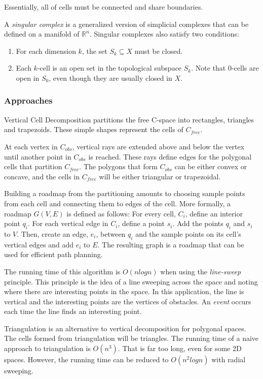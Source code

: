 \documentclass[10pt,conference]{ieeeconf}
\begin{document}
Essentially, all of cells must be connected and share boundaries. 

A \emph{singular complex} is a generalized version of simplicial complexes that can be defined on a manifold of $\mathbb{R}^n$. Singular complexes also satisfy two conditions:

\begin{enumerate}
\item For each dimension $k$, the set $S_k \subseteq X$ must be closed. 
\item Each $k$-cell is an open set in the topological subspace $S_k$. Note that 0-cells are open in $S_0$, even though they are usually closed in $X$.
\end{enumerate} 

\subsubsection{Approaches}

Vertical Cell Decomposition partitions the free C-space into rectangles, triangles and trapezoids. These simple shapes represent the cells of $C_{free}$. 

At each vertex in $C_{obs}$, vertical rays are extended above and below the vertex until another point in $C_{obs}$ is reached. These rays define edges for the polygonal cells that partition $C_{free}$. The polygons that form $C_{obs}$ can be either convex or concave, and the cells in $C_{free}$ will be either triangular or trapezoidal. 

Building a roadmap from the partitioning amounts to choosing sample points from each cell and connecting them to edges of the cell. More formally, a roadmap $G(V,E)$ is defined as follows: For every cell, $C_i$, define an interior point $q_i$. For each vertical edge in $C_i$, define a point $s_i$. Add the points $q_i$ and $s_i$ to $V$. Then, create an edge, $e_i$, between $q_i$ and the sample points on its cell's vertical edges and add $e_i$ to $E$. The resulting graph is a roadmap that can be used for efficient path planning.

The running time of this algorithm is $O(nlogn)$ when using the \emph{line-sweep} principle. This principle is the idea of a line sweeping across the space and noting where there are interesting points in the space. In this application, the line is vertical and the interesting points are the vertices of obstacles. An \emph{event} occurs each time the line finds an interesting point. 

Triangulation is an alternative to vertical decomposition for polygonal spaces. The cells formed from triangulation will be triangles. The running time of a naive approach to triangulation is $O(n^3)$. That is far too long, even for some 2D spaces. However, the running time can be reduced to $O(n^2logn)$ with radial sweeping.
\end{document}
